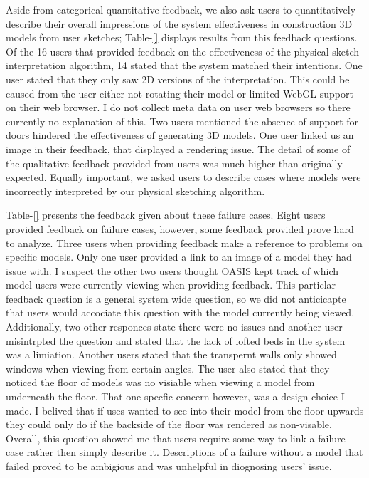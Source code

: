 Aside from categorical quantitative feedback, we also ask users to quantitatively describe their overall impressions of the system effectiveness in construction 3D models from user sketches; 
Table-\ref{} displays results from this feedback questions.
Of the 16 users that provided feedback on the effectiveness of the physical sketch interpretation algorithm, 14 stated that the system matched their intentions.
One user stated that they only saw 2D versions of the interpretation.
This could be caused from the user either not rotating their model or limited WebGL support on their web browser.
I do  not collect meta data on user web browsers so there currently no explanation of this.
Two users mentioned the absence of support for doors hindered the effectiveness of generating 3D models.
One user linked us an image in their feedback, that displayed a rendering issue.
The detail of some of the qualitative feedback provided from users was much higher than originally expected.
Equally important, we asked users to describe cases where models were incorrectly interpreted by our physical sketching algorithm.

Table-\ref{} presents the feedback given about these failure cases.
Eight users provided feedback on failure cases, however, some feedback provided prove hard to analyze.
Three users when providing feedback make a reference to problems on specific models.
Only one user provided a link to an image of a model they had issue with.
I suspect the other two users thought OASIS kept track of which model users were currently viewing when providing feedback.
This particlar feedback question is a general system wide question, so we did not anticicapte that users would accociate this question with the model currently being viewed.
Additionally, two other responces state there were no issues and another user misintrpted the question and stated that the lack of lofted beds in the system was a limiation.
Another users stated that the transpernt walls only showed windows when viewing from certain angles.
The user also stated that they noticed the floor of models was no visiable when viewing a model from underneath the floor.
That one specfic concern however, was a design choice I made.
I belived that if uses wanted to see into their model from the floor upwards they could only do if the backside of the floor was rendered as non-visable.
Overall, this question showed me that users require some way to link a failure case rather then  simply describe it.
Descriptions of a failure without a model that failed proved to be ambigious and was unhelpful in  diognosing users' issue.

